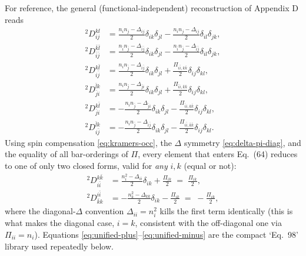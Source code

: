 \documentclass[11pt,a4paper]{article}
\newcommand{\Dtwo}{{}^2D}
\newcommand{\PiMat}{\Pi}
\newcommand{\DeltaMat}{\Delta}
\begin{document}
For reference, the general (functional-independent) reconstruction of
Appendix D reads
\begin{align}
\Dtwo^{kl}_{ij} &=
 \frac{n_in_j-\DeltaMat_{ij}}{2}\delta_{ik}\delta_{jl}
 -\frac{n_in_j-\DeltaMat_{ij}}{2}\delta_{il}\delta_{jk},
 \label{eq:98a}\\
\Dtwo^{\bar k\bar l}_{\bar i\bar j} &=
 \frac{n_{\bar i}n_{\bar j}-\DeltaMat_{\bar i\bar j}}{2}\delta_{ik}\delta_{jl}
 -\frac{n_{\bar i}n_{\bar j}-\DeltaMat_{\bar i\bar j}}{2}\delta_{il}\delta_{jk},
 \label{eq:98b}\\
\Dtwo^{k\bar l}_{i\bar j} &=
 \frac{n_in_{\bar j}-\DeltaMat_{i\bar j}}{2}\delta_{ik}\delta_{jl}
 +\frac{\PiMat_{i\bar i,k\bar k}}{2}\delta_{ij}\delta_{kl},
 \label{eq:98c}\\
\Dtwo^{\bar lk}_{\bar ji} &=
 \frac{n_in_{\bar j}-\DeltaMat_{\bar ji}}{2}\delta_{ik}\delta_{jl}
 +\frac{\PiMat_{\bar ii,\bar k\bar k}}{2}\delta_{ij}\delta_{kl},
 \label{eq:98d}\\
\Dtwo^{k\bar l}_{\bar ji} &=
 -\frac{n_in_{\bar j}-\DeltaMat_{\bar ji}}{2}\delta_{ik}\delta_{jl}
 -\frac{\PiMat_{\bar ii,k\bar k}}{2}\delta_{ij}\delta_{kl},
 \label{eq:98e}\\
\Dtwo^{\bar lk}_{i\bar j} &=
 -\frac{n_in_{\bar j}-\DeltaMat_{i\bar j}}{2}\delta_{ik}\delta_{jl}
 -\frac{\PiMat_{i\bar i,\bar k\bar k}}{2}\delta_{ij}\delta_{kl}.
 \label{eq:98f}
\end{align}
Using spin compensation \eqref{eq:kramers-occ}, the $\DeltaMat$
symmetry \eqref{eq:delta-pi-diag}, and the equality of all
bar-orderings of $\PiMat$, every element that enters Eq.~(64) reduces
to one of only two closed forms, valid for \emph{any} $i,k$ (equal or
not):
\begin{align}
\Dtwo^{k\bar k}_{i\bar i} &= \frac{n_i^2-\DeltaMat_{ii}}{2}\delta_{ik}
 +\frac{\PiMat_{ik}}{2}
 \;=\;\frac{\PiMat_{ik}}{2},
 \label{eq:unified-plus}\\
\Dtwo^{i\bar i}_{\bar kk} &= -\frac{n_k^2-\DeltaMat_{kk}}{2}\delta_{ik}
 -\frac{\PiMat_{ik}}{2}
 \;=\;-\frac{\PiMat_{ik}}{2},
 \label{eq:unified-minus}
\end{align}
where the diagonal-$\DeltaMat$ convention $\DeltaMat_{ii}=n_i^2$ kills
the first term identically (this is what makes the diagonal case,
$i=k$, consistent with the off-diagonal one via
$\PiMat_{ii}=n_i$). Equations \eqref{eq:unified-plus}--\eqref{eq:unified-minus}
are the compact `Eq.~98' library used repeatedly below.
\end{document}
